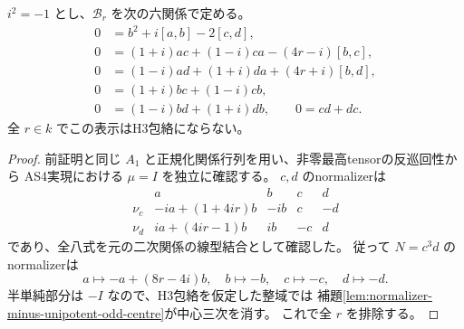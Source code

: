 \begin{theorem}[例外的一パラメータ表示の全排除]
\label{thm:ds211-B-all-excluded}
$i^2=-1$ とし、$\mathcal B_r$ を次の六関係で定める。
\[
\begin{split}
0&=b^2+i[a,b]-2[c,d],\\
0&=(1+i)ac+(1-i)ca-(4r-i)[b,c],\\
0&=(1-i)ad+(1+i)da+(4r+i)[b,d],\\
0&=(1+i)bc+(1-i)cb,\\
0&=(1-i)bd+(1+i)db,\qquad0=cd+dc.
\end{split}
\]
全 $r\in k$ でこの表示はH3包絡にならない。
\end{theorem}
\begin{proof}
前証明と同じ $A_1$ と正規化関係行列を用い、非零最高tensorの反巡回性から
AS4実現における $\mu=I$ を独立に確認する。
$c,d$ のnormalizerは
\[
\begin{array}{c|rrrr}
 &a&b&c&d\\\hline
\nu_c&-ia+(1+4ir)b&-ib&c&-d\\
\nu_d&ia+(4ir-1)b&ib&-c&d
\end{array}
\]
であり、全八式を元の二次関係の線型結合として確認した。
従って $N=c^3d$ のnormalizerは
\[
 a\longmapsto-a+(8r-4i)b,\quad b\longmapsto-b,\quad
 c\longmapsto-c,\quad d\longmapsto-d.
\]
半単純部分は $-I$ なので、H3包絡を仮定した整域では
補題\ref{lem:normalizer-minus-unipotent-odd-centre}が中心三次を消す。
これで全 $r$ を排除する。
\end{proof}


